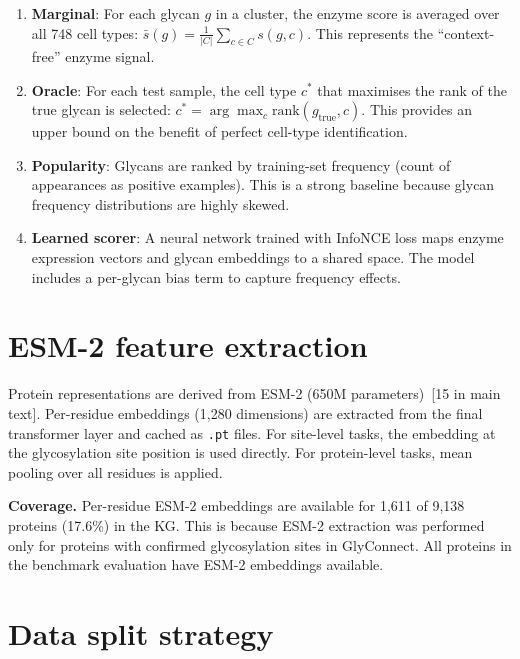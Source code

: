 \documentclass[11pt,a4paper]{article}
\begin{document}
\begin{enumerate}
\item \textbf{Marginal}: For each glycan $g$ in a cluster, the enzyme score is
averaged over all 748 cell types:
$\bar{s}(g) = \frac{1}{|C|} \sum_{c \in C} s(g, c)$.
This represents the ``context-free'' enzyme signal.

\item \textbf{Oracle}: For each test sample, the cell type $c^*$ that
maximises the rank of the true glycan is selected:
$c^* = \arg\max_c \text{rank}(g_{\text{true}}, c)$.
This provides an upper bound on the benefit of perfect cell-type identification.

\item \textbf{Popularity}: Glycans are ranked by training-set frequency
(count of appearances as positive examples). This is a strong baseline because
glycan frequency distributions are highly skewed.

\item \textbf{Learned scorer}: A neural network trained with InfoNCE loss maps
enzyme expression vectors and glycan embeddings to a shared space. The model
includes a per-glycan bias term to capture frequency effects.
\end{enumerate}

\section{ESM-2 feature extraction}
\label{sec:esm2}

Protein representations are derived from ESM-2 (650M parameters)~[15 in main
text]. Per-residue embeddings (1,280 dimensions) are extracted from the final
transformer layer and cached as \texttt{.pt} files. For site-level tasks,
the embedding at the glycosylation site position is used directly. For
protein-level tasks, mean pooling over all residues is applied.

\textbf{Coverage.} Per-residue ESM-2 embeddings are available for 1,611 of
9,138 proteins (17.6\%) in the KG. This is because ESM-2 extraction was
performed only for proteins with confirmed glycosylation sites in GlyConnect.
All proteins in the benchmark evaluation have ESM-2 embeddings available.

\section{Data split strategy}
\label{sec:splits}
\end{document}
